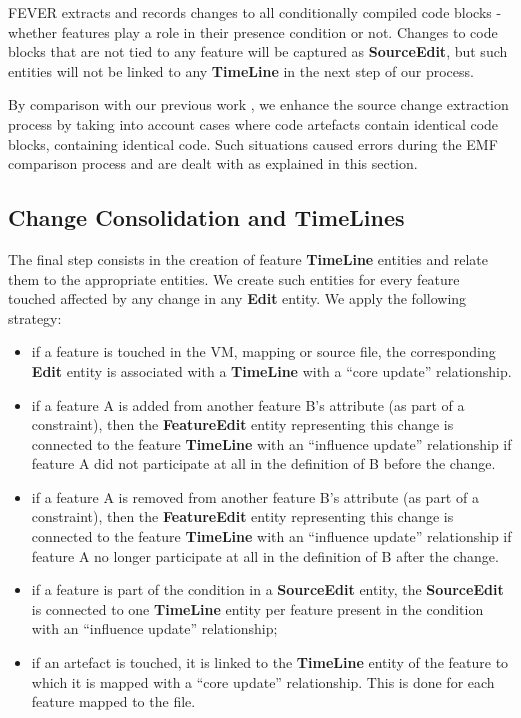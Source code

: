FEVER extracts and records changes to all conditionally compiled code blocks - whether features play a role
in their presence condition or not.
Changes to code blocks that are not tied to any feature will be captured as \textbf{SourceEdit}, but
such entities will not be linked to any \textbf{TimeLine} in the next step of our process.

By comparison with our previous work \citep{dintzner_fever:_2016}, we enhance the source change extraction process by taking into account cases
where code artefacts contain identical code blocks, containing identical code. Such situations caused errors
during the EMF comparison process and are dealt with as explained in this section.


\subsection{Change Consolidation and TimeLines}
\label{sec:timelines}

The final step consists in the creation of feature \textbf{TimeLine} entities and relate them to the appropriate entities.
We create such entities for every feature touched affected by any change in any \textbf{Edit} entity.
We apply the following strategy: 
\begin{itemize}
\item if a feature is touched in the VM, mapping or source file, the corresponding \textbf{Edit} entity is associated with a \textbf{TimeLine} with a ``core update'' relationship.
\item if a feature A is added from another feature B's attribute (as part of a constraint), then the \textbf{FeatureEdit} entity representing this change is connected to the feature \textbf{TimeLine} with an ``influence update'' relationship if feature A did not participate at all in the definition of B before the change.
\item if a feature A is removed from another feature B's attribute (as part of a constraint), then the \textbf{FeatureEdit} entity representing this change is connected to the feature \textbf{TimeLine} with an ``influence update'' relationship if feature A no longer participate at all in the definition of B after the change.
\item if a feature is part of the condition in a \textbf{SourceEdit} entity, the \textbf{SourceEdit} is connected to one \textbf{TimeLine} entity per feature present in the condition with an ``influence update'' relationship;
\item if an artefact is touched, it is linked to the \textbf{TimeLine} entity of the feature to which it is mapped with a ``core update'' relationship. This is done for each feature mapped to the file.
\end{itemize}

